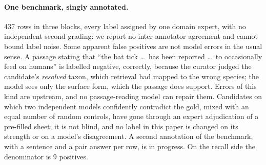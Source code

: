 \documentclass[11pt]{article}
\begin{document}
\paragraph{One benchmark, singly annotated.}
437 rows in three blocks, every label assigned by one domain expert, with no independent second
grading: we report no inter-annotator agreement and cannot bound label noise. Some apparent false
positives are not model errors in the usual sense. A passage stating that ``the bat tick \ldots\ has
been reported \ldots\ to occasionally feed on humans'' is labelled negative, correctly, because the
curator judged the candidate's \emph{resolved} taxon, which retrieval had mapped to the wrong
species; the model sees only the surface form, which the passage does support. Errors of this kind
are upstream, and no passage-reading model can repair them. Candidates on which two independent
models confidently contradict the gold, mixed with an equal number of random controls, have gone
through an expert adjudication of a pre-filled sheet; it is not blind, and no label in this paper is
changed on its strength or on a model's disagreement. A second annotation of the benchmark, with a
sentence and a pair answer per row, is in progress. On the
recall side the denominator is 9 positives.
\end{document}
